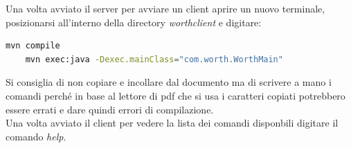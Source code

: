 \documentclass[11pt]{report}
\begin{document}
	Una volta avviato il server per avviare un client aprire un nuovo terminale, posizionarsi all'interno della directory \textit{worthclient} e digitare:
	\begin{lstlisting}[language=bash]
	mvn compile
	mvn exec:java -Dexec.mainClass="com.worth.WorthMain"
	\end{lstlisting}
	
	Si consiglia di non copiare e incollare dal documento ma di scrivere a mano i comandi perché in base al lettore di pdf che si usa i caratteri copiati potrebbero essere errati e dare quindi errori di compilazione.\\
	Una volta avviato il client per vedere la lista dei comandi disponbili digitare il comando \textit{help}.
	
	
	
	

	
	
	
	
	 
	
	
	 
	
	
	
	
	
	
\end{document}

